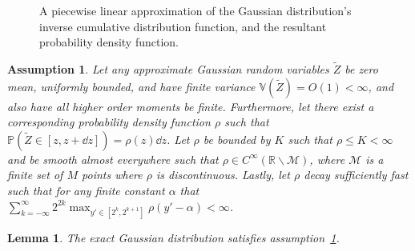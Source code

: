 \documentclass[9pt,a4paper,english]{extarticle}
\newtheorem{lemma}[theorem]{Lemma}
\newtheorem{assumption}{Assumption}[section]
\begin{document}
\begin{figure}[htb]
\centering
\hfil
{}\hfil
{}\hfil

\caption{A piecewise linear approximation of the Gaussian distribution's inverse cumulative distribution function, and the resultant probability density function.}
\label{fig:piecewise_linear_approximation}
\end{figure}

\begin{assumption}
\label{asmp:approximate_random_variables}
Let any approximate Gaussian random variables $ \widetilde{Z} $ be zero mean, uniformly bounded, and have finite variance $ \mathbb{V}(\widetilde{Z}) = O(1) < \infty  $, and also have all higher order moments be finite. Furthermore, let there exist a corresponding probability density function $ \rho $ such that $ \mathbb{P}(\widetilde{Z} \in [z, z + \dd{z}]) = \rho(z) \dd{z}$.  Let $ \rho $ be bounded by $ K $ such that $ \rho \leq K < \infty $ and be smooth almost everywhere such that $ \rho \in C^\infty(\mathbb{R}\backslash\mathcal{M})$, where $ \mathcal{M} $ is a finite set of $ M $ points where $ \rho $ is discontinuous. Lastly, let $ \rho $ decay sufficiently fast such that for any finite constant $ \alpha $ that $ \sum_{k=-\infty}^\infty 2^{2k} \max_{y'\in[2^{k}, 2^{k+1}]} \rho(y'-\alpha) < \infty $.
\end{assumption}

\begin{lemma}
\label{lemma:exact_gaussian_distribution}
The exact Gaussian distribution satisfies assumption~\ref{asmp:approximate_random_variables}.
\end{lemma}
\end{document}
